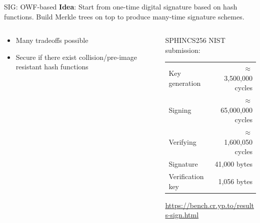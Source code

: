 \documentclass[xcolor=table,10pt,aspectratio=169]{beamer}
\begin{document}
\begin{frame}[label={sec:org75c3702}]{SIG: OWF-based}
\textbf{Idea}: Start from one-time digital signature based on hash functions. Build Merkle trees on top to produce many-time signature schemes.

\begin{columns}[t]
\begin{column}{0.5\columnwidth}
\begin{itemize}
\item Many tradeoffs possible
\item Secure if there exist collision/pre-image resistant hash functions
\end{itemize}
\end{column}

\begin{column}{0.5\columnwidth}
SPHINCS256 NIST submission:

\begin{center}
\begin{tabular}{lr}
Key generation & \(\approx\)  3,500,000 cycles\\
Signing & \(\approx\) 65,000,000 cycles\\
Verifying & \(\approx\)  1,600,050 cycles\\
Signature & 41,000 bytes\\
Verification key & 1,056 bytes\\
\end{tabular}

\end{center}

\small \url{https://bench.cr.yp.to/results-sign.html}
\end{column}
\end{columns}
\end{frame}
\end{document}
